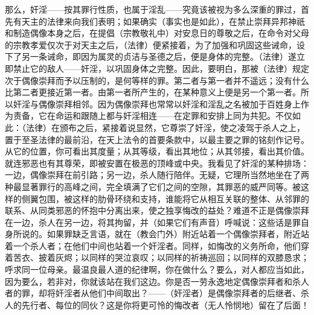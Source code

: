 那么，奸淫——按其罪行性质，也属于淫乱——究竟该被视为多么深重的罪过，首先有天主的法律来向我们表明；如果确实（事实也是如此），在禁止崇拜异邦神祇和制造偶像本身之后，在提倡（宗教敬礼中）对安息日的尊敬之后，在命令对父母的宗教孝爱仅次于对天主之后，（法律）便紧接着，为了加强和巩固这些诫命，设下了另一条诫命，即因为属灵的贞洁与圣德之后，便是身体的完整。（法律）遂立即禁止它的敌人——奸淫，以巩固身体之完整。因此，要明白，那被（法律）规定次于偶像崇拜而予以压制的，是何等样的罪。第二者与第一者并不遥远；没有什么比第二者更接近第一者。由第一者所产生的，在某种意义上便是另一个第一者。所以奸淫与偶像崇拜相邻。因为偶像崇拜也常常以奸淫和淫乱之名被加于百姓身上作为责备，它在命运和跟随上都与奸淫相连——在定罪和安排上同为共犯。不仅如此：（法律）在颁布之后，紧接着说显然，它尊崇了奸淫，使之凌驾于杀人之上，置于至圣法律的最前沿，在天上法令的首要条款中，以最主要之罪的铭刻作记号。从它的位置，你可看出其度量；从其等级，看出其地位；从其邻接，看出其价值。就连邪恶也有其尊荣，即被安置在极恶的顶峰或中央。我看见了奸淫的某种排场：一边，偶像崇拜在前引路；另一边，杀人随行陪伴。无疑，它理所当然地坐在了两种最显著罪行的高峰之间，完全填满了它们之间的空隙，其罪恶的威严同等。被这样的侧翼包围，被这样的肋骨环绕和支持，谁能将它从相互关联的整体、从邻罪的联系、从同类邪恶的怀抱中分离出来，使之独享悔改的益处？难道不正是偶像崇拜在一边，杀人在另一边，将其拘留，并（如果它们有声音）呼喊说：这些话是罪自身所说的。如果罪缺乏言语，就在（教会门外）附近站着一个偶像崇拜者，附近站着一个杀人者；在他们中间也站着一个奸淫者。同样，如悔改的义务所命，他们穿着苦衣、披着灰烬；以同样的哭泣哀叹；以同样的祈祷巡回；以同样的双膝恳求；呼求同一位母亲。最温良最人道的纪律啊，你在做什么？要么，对人都应当如此，因为要么，若非对，你就该站在我们这边。你是否一劳永逸地定偶像崇拜者和杀人者的罪，却将奸淫者从他们中间取出？——（奸淫者）是偶像崇拜者的后继者、杀人的先行者、每位的同伙？这是你将更可怜的悔改者（无人怜悯地）留在了后面！\par

